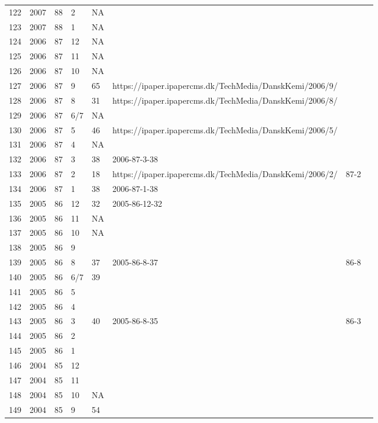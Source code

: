 \begin{longtable}{ |l|l|l|l|l|l|l|l| }
122 & 2007 & 88 &     2 &      NA &  &  & \\
123 & 2007 & 88 &     1 &      NA &  &  & \\
124 & 2006 & 87 &    12 &      NA &  &  & \\
125 & 2006 & 87 &    11 &      NA &  &  & \\
126 & 2006 & 87 &    10 &      NA &  &  & \\
127 & 2006 & 87 &     9 &      65 & https://ipaper.ipapercms.dk/TechMedia/DanskKemi/2006/9/ &  & \\
128 & 2006 & 87 &     8 &      31 & https://ipaper.ipapercms.dk/TechMedia/DanskKemi/2006/8/ &  & \\
129 & 2006 & 87 &   6/7 &      NA &  &  & \\
130 & 2006 & 87 &     5 &      46 & https://ipaper.ipapercms.dk/TechMedia/DanskKemi/2006/5/ &  & \\
131 & 2006 & 87 &     4 &      NA &  &  & \\
132 & 2006 & 87 &     3 &      38 & 2006-87-3-38 &  & \\
133 & 2006 & 87 &     2 &      18 & https://ipaper.ipapercms.dk/TechMedia/DanskKemi/2006/2/ & 87-2  & \\
134 & 2006 & 87 &     1 &      38 & 2006-87-1-38 &  & \\
135 & 2005 & 86 &    12 &      32 & 2005-86-12-32 &  & \\
136 & 2005 & 86 &    11 &      NA &  &  & \\
137 & 2005 & 86 &    10 &      NA &  &  & \\
138 & 2005 & 86 &     9 &         &  &  & \\
139 & 2005 & 86 &     8 &      37 & 2005-86-8-37 & 86-8  & \\
140 & 2005 & 86 &   6/7 &      39 &  &  & \\
141 & 2005 & 86 &     5 &         &  &  & \\
142 & 2005 & 86 &     4 &         & &  & \\
143 & 2005 & 86 &     3 &      40 & 2005-86-8-35 & 86-3 & \\
144 & 2005 & 86 &     2 &         &  &  & \\
145 & 2005 & 86 &     1 &         &  &  & \\
146 & 2004 & 85 &    12 &         &  &  & \\
147 & 2004 & 85 &    11 &         &  &  & \\
148 & 2004 & 85 &    10 &      NA &  &  & \\
149 & 2004 & 85 &     9 &      54 &  &  & \\

\end{longtable}
